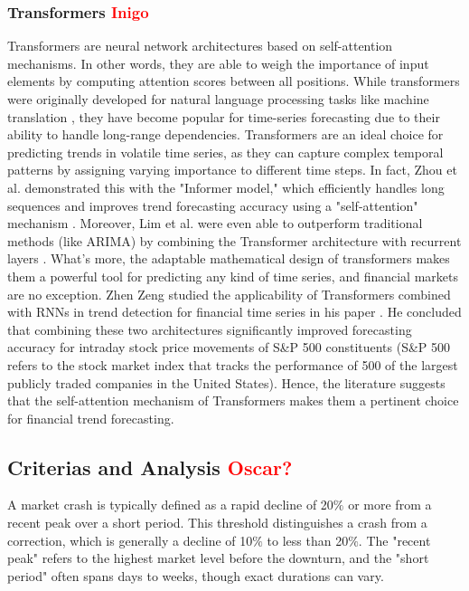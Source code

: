\documentclass[12pt, letterpaper]{article}
\begin{document}
    \subsubsection*{Transformers \textcolor{red}{Inigo}}
Transformers are neural network architectures based on self-attention mechanisms. In other words, they are able to weigh the importance of input elements by computing attention scores between all positions. While transformers were originally developed for natural language processing tasks like machine translation \cite{vaswani2017attention}, they have become popular for time-series forecasting due to their ability to handle long-range dependencies.
Transformers are an ideal choice for predicting trends in volatile time series, as they can capture complex temporal patterns by assigning varying importance to different time steps. In fact, Zhou et al. demonstrated this with the "Informer model," which efficiently handles long sequences and improves trend forecasting accuracy using a "self-attention" mechanism \cite{zhou2021informer}. Moreover, Lim et al. were even able to outperform traditional methods (like ARIMA) by combining the Transformer architecture with recurrent layers \cite{lim2021temporal}. 
What's more, the adaptable mathematical design of transformers makes them a powerful tool for predicting any kind of time series, and financial markets are no exception. Zhen Zeng studied the applicability of Transformers combined with RNNs in trend detection for financial time series in his paper \cite{zeng2023financial}. He concluded that combining these two architectures significantly improved forecasting accuracy for intraday stock price movements of S&P 500 constituents (S&P 500 refers to the stock market index that tracks the performance of 500 of the largest publicly traded companies in the United States). Hence, the literature suggests that the self-attention mechanism of Transformers makes them a pertinent choice for financial trend forecasting.


\subsection*{Criterias and Analysis \textcolor{red}{Oscar?}}
A market crash is typically defined as a rapid decline of 20$\%$ or more from a recent peak over a short period\cite{Fonville}\cite{Investo}. This threshold distinguishes a crash from a correction, which is generally a decline of 10$\%$ to less than 20$\%$. The "recent peak" refers to the highest market level before the downturn, and the "short period" often spans days to weeks, though exact durations can vary.

\pagebreak
\printbibliography

\end{document}
